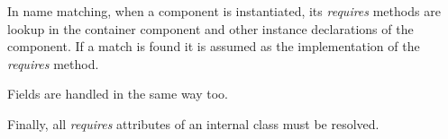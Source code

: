 \documentclass[acmsmall]{acmart}
\begin{document}
In name matching, when a component is instantiated, its \textit{requires} methods are lookup in the container component and other instance declarations of the component.
If a match is found it is assumed as the implementation of the \textit{requires} method.

Fields are handled in the same way too.

Finally, all \textit{requires} attributes of an internal class must be resolved.



\end{document}
